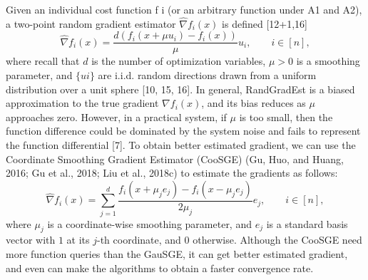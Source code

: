 \documentclass{article}
\theoremstyle{definition}
\theoremstyle{remark}
\begin{document}
{\color{Brown}
Given an individual cost function f i (or an arbitrary function under A1 and A2), a two-point random gradient estimator $\hat{\nabla} f_i(x)$ is defined [12+1,16]
\begin{equation}
\hat{\nabla} f_i(x) = \frac{d(f_i(x+\mu u_i) - f_i(x))}{\mu}u_i,\qquad i\in [n],
\end{equation}
where recall that $d$ is the number of optimization variables, $\mu > 0$ is a smoothing parameter, and
$\{u i\}$ are i.i.d. random directions drawn from a uniform distribution over a unit sphere [10, 15, 16]. In general, RandGradEst is a biased approximation to the true gradient $\nabla f_i(x)$, and its bias reduces as $\mu$ approaches zero. However, in a practical system, if $\mu$ is too small, then the function difference
could be dominated by the system noise and fails to represent the function differential [7].}
{\color{Green}
To obtain better estimated gradient, we
can use the Coordinate Smoothing Gradient Estimator
(CooSGE) (Gu, Huo, and Huang, 2016; Gu et al., 2018; Liu et al., 2018c) to estimate the gradients as follows:
\begin{equation}
\hat{\nabla} f_i(x) = \sum_{j=1}^d \frac{f_i(x+\mu_je_j) - f_i(x-\mu_je_j)}{2\mu_j}e_j,\qquad i\in [n],
\end{equation}
where $\mu_j$ is a coordinate-wise smoothing parameter, and $e_j$ is a standard basis vector with $1$ at its $j$-th coordinate,
and $0$ otherwise. Although the CooSGE need more function queries than the GauSGE, it can get better estimated gradient, and even can make the algorithms to obtain a faster convergence rate.
}
\end{document}
